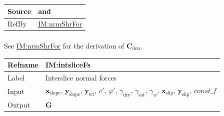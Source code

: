 \documentclass[12pt]{article}
\begin{document}
\begin{minipage}{\textwidth}
\begin{tabular}{>{\raggedright}p{}>{\raggedright\arraybackslash}p{}}
\\ \midrule
Source & \cite{chen2005} and \cite{karchewski2012}
         
\\ \midrule
RefBy & \hyperref[IM:nrmShrFor]{IM:nrmShrFor}
        
\\ \bottomrule
\end{tabular}
\end{minipage}

\paragraph{}
\label{IM:nrmShrForDenDeriv}
See \hyperref[IM:nrmShrFor]{IM:nrmShrFor} for the derivation of ${\symbf{C}_{\text{den}}}$.

\medskip
\noindent
\begin{minipage}{\textwidth}
\begin{tabular}{>{\raggedright}p{}>{\raggedright\arraybackslash}p{}}
\toprule \textbf{Refname} & \textbf{IM:intsliceFs}
\label{IM:intsliceFs}
\\ \midrule
Label & Interslice normal forces
        
\\ \midrule
Input & ${\symbf{x}_{\text{slope}}}$, ${\symbf{y}_{\text{slope}}}$, ${\symbf{y}_{\text{wt}}}$, $c'$, $φ'$, ${γ_{\text{dry}}}$, ${γ_{\text{sat}}}$, ${γ_{w}}$, ${\symbf{x}_{\text{slip}}}$, ${\symbf{y}_{\text{slip}}}$, $\mathit{const\_f}$
        
\\ \midrule
Output & $\symbf{G}$
         

\end{tabular}
\end{minipage}
\end{document}
